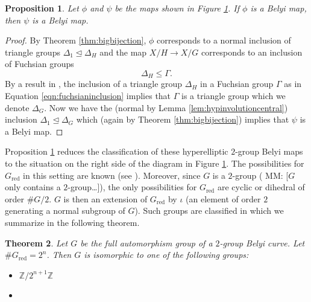 \documentclass{dcthesis}
\newcommand{\ZZ}{\mathbb Z}
\newcommand{\mm}[1]{{\color{blue} \sf MM: [#1]}}
\DeclareMathOperator{\rred}{red}
\newtheorem{prop}{Proposition}[section]
\newtheorem{theorem}[prop]{Theorem}
\theoremstyle{definition}
\theoremstyle{remark}
\numberwithin{equation}{section}
\numberwithin{figure}{section}
\begin{document}
{{\begin{figure}[ht]
      \label{fig:hyperellipticbelyi}
    \end{figure}
    \begin{prop}\label{prop:liftbelyi}
      Let $\phi$ and $\psi$ be the maps shown in
      Figure \ref{fig:hyperellipticbelyi}.
      If $\phi$ is a Belyi map,
      then $\psi$ is a Belyi map.
    \end{prop}
    \begin{proof}
      By Theorem \ref{thm:bigbijection},
      $\phi$ corresponds to
      a normal inclusion of triangle groups
      $
        \Delta_1\trianglelefteq\Delta_H
      $
      and the map $X / H \to X / G$
      corresponds to an inclusion of Fuchsian groups
      \begin{equation}\label{eqn:fuchsianinclusion}
        \Delta_H\leq\Gamma.
      \end{equation}
      By a result in \cite[Page 36]{singerman},
      the inclusion of a triangle group $\Delta_H$ in
      a Fuchsian group $\Gamma$
      as in Equation \ref{eqn:fuchsianinclusion}
      implies that $\Gamma$ is a triangle group
      which we denote $\Delta_G$.
      Now we have the
      (normal by Lemma \ref{lem:hypinvolutioncentral})
      inclusion
      $\Delta_1\trianglelefteq\Delta_G$
      which (again by Theorem \ref{thm:bigbijection})
      implies that $\psi$ is a Belyi map.
    \end{proof}
    Proposition \ref{prop:liftbelyi}
    reduces the classification of these hyperelliptic $2$-group Belyi maps
    to the situation on the right side of the diagram in
    Figure \ref{fig:hyperellipticbelyi}.
    The possibilities for $G_{\rred}$
    in this setting are known
    (see \cite[\S 1.1]{dolgachev}).
    Moreover, since $G$ is a
    $2$-group (\mm{$G$ only contains a $2$-group\ldots}),
    the only possibilities for $G_{\rred}$
    are cyclic or dihedral of order $\#G / 2$.
    $G$ is then an extension of $G_{\rred}$
    by $\iota$
    (an element of order $2$ generating a normal subgroup of $G$).
    Such groups are classified in
    \cite{hyperelliptic} which we summarize in the
    following theorem.
    \begin{theorem}
      \label{thm:hyperelliptic}
      Let $G$ be the full automorphism group of a
      $2$-group Belyi curve.
      Let $\#G_{\rred} = 2^n$.
      Then $G$ is isomorphic to one of the following groups:
      \begin{itemize}
        \item
          $\ZZ/2^{n+1}\ZZ$
        \item

\end{itemize}
\end{theorem}}}
\end{document}
